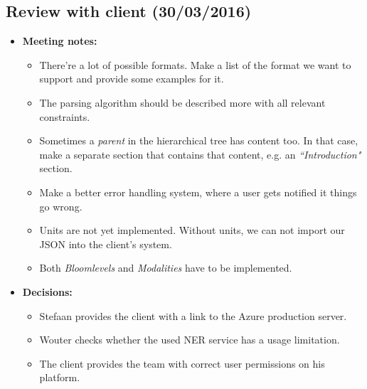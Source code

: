 \documentclass[a4paper,12pt]{article}
\begin{document}
\subsection{Review with client (30/03/2016)}
\begin{itemize}
\item \textbf{Meeting notes:} 
\begin{itemize}
\item There're a lot of possible formats. Make a list of the format we want to support and provide some examples for it.
\item The parsing algorithm should be described more with all relevant constraints.
\item Sometimes a \textit{parent} in the hierarchical tree has content too. In that case, make a separate section that contains that content, e.g. an \textit{``Introduction"} section.
\item Make a better error handling system, where a user gets notified it things go wrong.
\item Units are not yet implemented. Without units, we can not import our JSON into the client's system.
\item Both \textit{Bloomlevels} and \textit{Modalities} have to be implemented.
\end{itemize}
\item \textbf{Decisions:} 
\begin{itemize}
\item Stefaan provides the client with a link to the Azure production server.
\item Wouter checks whether the used NER service has a usage limitation.
\item The client provides the team with correct user permissions on his platform.
\end{itemize}
\end{itemize}
\end{document}

